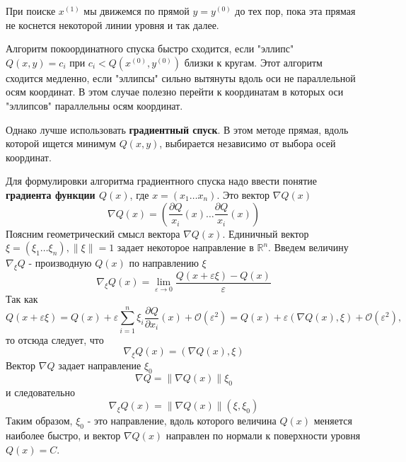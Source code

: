 При поиске $x^{(1)}$ мы движемся по прямой $y = y^{(0)}$ до тех пор, пока эта прямая не коснется некоторой линии уровня и так далее.

Алгоритм покоординатного спуска быстро сходится, если "эллипс" $Q(x, y) = c_i \textrm{ при } c_i < Q(x^{(0)}, y^{(0)})$ близки к кругам. Этот алгоритм сходится медленно, если "эллипсы" сильно вытянуты вдоль оси не параллельной осям координат. В этом случае полезно перейти к координатам в которых оси "эллипсов" параллельны осям координат.

Однако лучше использовать \textbf{градиентный спуск}. В этом методе прямая, вдоль которой ищется минимум $Q(x, y)$, выбирается независимо от выбора осей координат.

Для формулировки алгоритма градиентного спуска надо ввести понятие \textbf{градиента функции $Q(x)$}, где $x = (x_1 \dots x_n)$. Это вектор $\nabla Q(x)$
\begin{equation} \label{eq:8.1}
	\nabla Q(x) = (\frac{\partial Q}{x_i}(x) \dots \frac{\partial Q}{x_i}(x))
\end{equation}
Поясним геометрический смысл вектора $\nabla Q(x)$. Единичный вектор $\xi = (\xi_1 \dots \xi_n), \|\xi\| = 1$ задает некоторое направление в $\mathbb{R}^n$. Введем величину $\nabla_\xi Q$ - производную $Q(x)$ по направлению $\xi$
\begin{equation} \label{eq:8.2}
	\nabla_\xi Q(x) = \lim_{\varepsilon \to 0} \frac{Q(x+\varepsilon\xi) - Q(x)}{\varepsilon}
\end{equation}
Так как
\begin{equation} \label{eq:8.3}
	Q(x+\varepsilon\xi) = Q(x) + \varepsilon\sum^n_{i=1}{\xi_i \frac{\partial Q}{\partial x_i}(x) + \mathcal{O}(\varepsilon^2)} = Q(x) + \varepsilon(\nabla Q(x), \xi) + \mathcal{O}(\varepsilon^2),
\end{equation}
то отсюда следует, что
\begin{equation} \label{eq:8.4}
	\nabla_\xi Q(x) = (\nabla Q(x), \xi) 
\end{equation}
Вектор $\nabla Q$ задает направление $\xi_0$
\begin{equation} \label{eq:8.5}
	\nabla Q = \|\nabla Q(x)\|\xi_0 
\end{equation}
и следовательно
\begin{equation} \label{eq:8.6}
	\nabla_\xi Q(x) = \|\nabla Q(x)\|(\xi, \xi_0) 
\end{equation}
Таким образом, $\xi_0$ - это направление, вдоль которого величина $Q(x)$ меняется наиболее быстро, и вектор $\nabla Q(x)$ направлен по нормали к поверхности уровня $Q(x) = C$.

